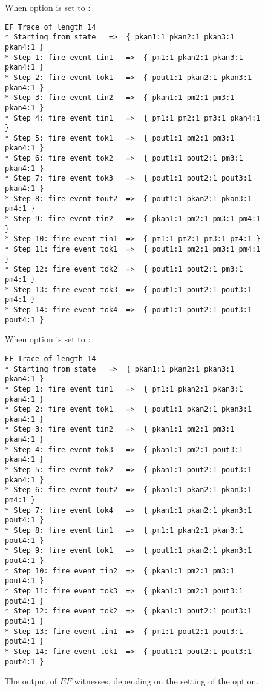 \begin{private}
\begin{figure}
When option  is set to :
\begin{lstlisting}
EF Trace of length 14
* Starting from state 	=>  { pkan1:1 pkan2:1 pkan3:1 pkan4:1 }
* Step 1: fire event tin1	=>  { pm1:1 pkan2:1 pkan3:1 pkan4:1 }
* Step 2: fire event tok1	=>  { pout1:1 pkan2:1 pkan3:1 pkan4:1 }
* Step 3: fire event tin2	=>  { pkan1:1 pm2:1 pm3:1 pkan4:1 }
* Step 4: fire event tin1	=>  { pm1:1 pm2:1 pm3:1 pkan4:1 }
* Step 5: fire event tok1	=>  { pout1:1 pm2:1 pm3:1 pkan4:1 }
* Step 6: fire event tok2	=>  { pout1:1 pout2:1 pm3:1 pkan4:1 }
* Step 7: fire event tok3	=>  { pout1:1 pout2:1 pout3:1 pkan4:1 }
* Step 8: fire event tout2	=>  { pout1:1 pkan2:1 pkan3:1 pm4:1 }
* Step 9: fire event tin2	=>  { pkan1:1 pm2:1 pm3:1 pm4:1 }
* Step 10: fire event tin1	=>  { pm1:1 pm2:1 pm3:1 pm4:1 }
* Step 11: fire event tok1	=>  { pout1:1 pm2:1 pm3:1 pm4:1 }
* Step 12: fire event tok2	=>  { pout1:1 pout2:1 pm3:1 pm4:1 }
* Step 13: fire event tok3	=>  { pout1:1 pout2:1 pout3:1 pm4:1 }
* Step 14: fire event tok4	=>  { pout1:1 pout2:1 pout3:1 pout4:1 }
\end{lstlisting}

When option  is set to :
\begin{lstlisting}
EF Trace of length 14
* Starting from state 	=>  { pkan1:1 pkan2:1 pkan3:1 pkan4:1 }
* Step 1: fire event tin1	=>  { pm1:1 pkan2:1 pkan3:1 pkan4:1 }
* Step 2: fire event tok1	=>  { pout1:1 pkan2:1 pkan3:1 pkan4:1 }
* Step 3: fire event tin2	=>  { pkan1:1 pm2:1 pm3:1 pkan4:1 }
* Step 4: fire event tok3	=>  { pkan1:1 pm2:1 pout3:1 pkan4:1 }
* Step 5: fire event tok2	=>  { pkan1:1 pout2:1 pout3:1 pkan4:1 }
* Step 6: fire event tout2	=>  { pkan1:1 pkan2:1 pkan3:1 pm4:1 }
* Step 7: fire event tok4	=>  { pkan1:1 pkan2:1 pkan3:1 pout4:1 }
* Step 8: fire event tin1	=>  { pm1:1 pkan2:1 pkan3:1 pout4:1 }
* Step 9: fire event tok1	=>  { pout1:1 pkan2:1 pkan3:1 pout4:1 }
* Step 10: fire event tin2	=>  { pkan1:1 pm2:1 pm3:1 pout4:1 }
* Step 11: fire event tok3	=>  { pkan1:1 pm2:1 pout3:1 pout4:1 }
* Step 12: fire event tok2	=>  { pkan1:1 pout2:1 pout3:1 pout4:1 }
* Step 13: fire event tin1	=>  { pm1:1 pout2:1 pout3:1 pout4:1 }
* Step 14: fire event tok1	=>  { pout1:1 pout2:1 pout3:1 pout4:1 }
\end{lstlisting}
\caption{The output of $EF$ witnesses, depending on the setting of the
 option.}
\label{FIG:TraceOutput}
\end{figure}

\end{private}
